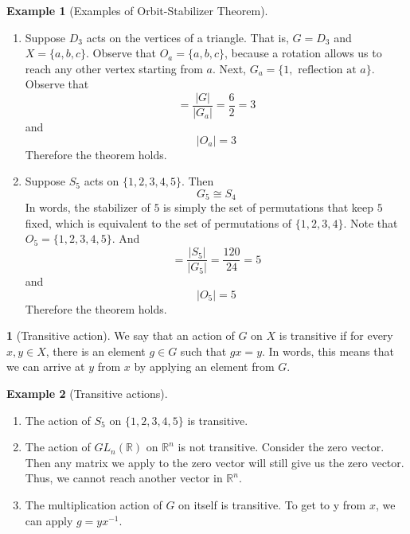 \documentclass[12pt]{article}
\theoremstyle{definition}
\newtheorem{definition}{\color{NavyBlue}{\textbf{Definition}}}
\newcommand{\R}{\mathbb{R}}
\newtheorem{example}{\color{WildStrawberry}Example}
\theoremstyle{definition}
\begin{document}
\begin{example}[Examples of Orbit-Stabilizer Theorem]
\begin{enumerate}
	\item Suppose $D_3$ acts on the vertices of a triangle. That is, $G=D_3$ and $X=\{a,b,c\}$. Observe that $O_a = \{a,b,c\}$, because a rotation allows us to reach any other vertex starting from $a$. Next, $G_a = \{1, \text{ reflection at } a\}$. Observe that 
	\begin{equation}
		[G:G_a] = \frac{|G|}{|G_a|} = \frac{6}{2} = 3
	\end{equation}
	and
	\begin{equation}
		|O_a| = 3
	\end{equation}
	Therefore the theorem holds.

	\item Suppose $S_5$ acts on $\{1,2,3,4,5\}$. Then 
	\begin{equation}
		G_5 \cong S_4
	\end{equation}
	In words, the stabilizer of $5$ is simply the set of permutations that keep $5$ fixed, which is equivalent to the set of permutations of $\{1,2,3,4\}$. Note that $O_5 = \{1,2,3,4,5\}$. And
	\begin{equation}
		[G:G_5] = \frac{|S_5|}{|G_5|} = \frac{120}{24} = 5	
	\end{equation}
	and
	\begin{equation}
		|O_5| = 5
	\end{equation}
	Therefore the theorem holds.
\end{enumerate}
\end{example}

\begin{definition}[Transitive action]
	We say that an action of $G$ on $X$ is transitive if for every $x,y \in X$, there is an element $g \in G$ such that $gx = y$. In words, this means that we can arrive at $y$ from $x$ by applying an element from $G$. 
\end{definition}

\begin{example}[Transitive actions]
\begin{enumerate}
	\item The action of $S_5$ on $\{1,2,3,4,5\}$ is transitive. 
	\item The action of $GL_n(\R)$ on $\R^n$ is not transitive. Consider the zero vector. Then any matrix we apply to the zero vector will still give us the zero vector. Thus, we cannot reach another vector in $\R^n$. 
	\item The multiplication action of $G$ on itself is transitive. To get to y from $x$, we can apply $g=yx^{-1}$.  
\end{enumerate}
\end{example}
\end{document}
